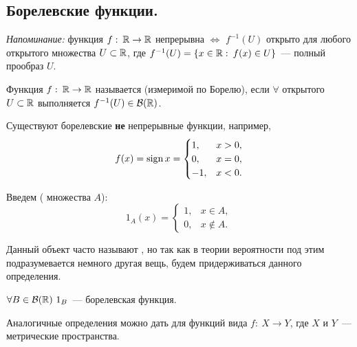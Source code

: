 \newpage
{}

\subsection{Борелевские функции.}

\textit{Напоминание:} функция $f:\:\mathbb{R}\to\mathbb{R}$ непрерывна $\Leftrightarrow$ $f^{-1}(U)$ открыто
для любого открытого множества $U\subset\mathbb{R}$, где $f^{-1}(U) = \{x\in\mathbb{R}:\: f(x)\in U\}$~---
полный прообраз $U$.

\begin{definition}
    Функция $f:\: \mathbb{R}\to\mathbb{R}$ называется  (измеримой по Борелю),
    если $\forall$ открытого $U\subset\mathbb{R}$ выполняется $f^{-1}(U)\in\mathcal{B}(\mathbb{R})$.
\end{definition}

\begin{exercise}
    Существуют борелевские \textbf{не} непрерывные функции, например,
    \[
        f(x)=\operatorname{sign} x = \begin{cases}
            1,  & x>0, \\
            0,  & x=0, \\
            -1, & x<0. \\
        \end{cases}
    \]
\end{exercise}

\begin{definition}
    Введем  ( множества $A$):
    \[
        1_A(x)=\begin{cases}
            1, & x\in A,    \\
            0, & x\notin A.
        \end{cases}
    \]

    \begin{remark}
        Данный объект часто называют , но
        так как в теории вероятности под этим подразумевается немного другая вещь, будем придерживаться
        данного определения.
    \end{remark}
\end{definition}

\begin{claim}
    $\forall B\in\mathcal{B}(\mathbb{R})\ 1_B$~--- борелевская функция.
\end{claim}

\begin{remark}
    Аналогичные определения можно дать для функций вида $f:\: X\to Y$, где
    $X$ и $Y$~--- метрические пространства.
\end{remark}

